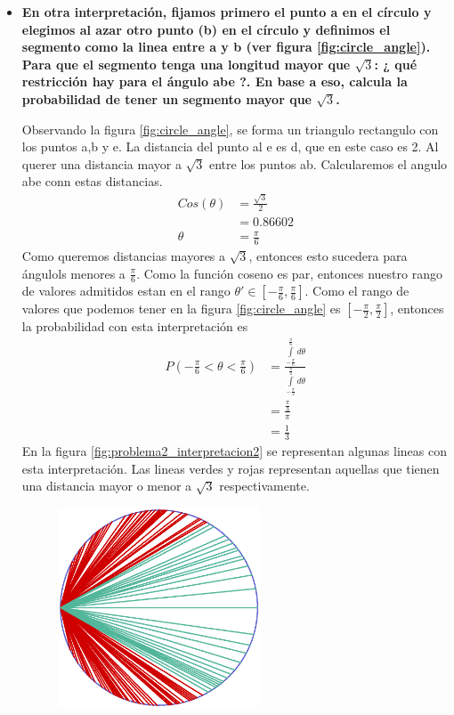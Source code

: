 \begin{itemize}
    \item \textbf{En otra interpretación, fijamos primero el punto a en el círculo y elegimos al azar otro punto (b) en el círculo y definimos el segmento como la linea entre a y b (ver figura \ref{fig:circle_angle}). Para que el segmento tenga una longitud mayor que $\sqrt{3}$: ¿ qué restricción hay para el ángulo abe ?. En base a eso, calcula la probabilidad de tener un segmento mayor que $\sqrt{3}$.}

          Observando la figura \ref{fig:circle_angle}, se forma un triangulo rectangulo con los puntos a,b y e. La distancia del punto al e es d, que en este caso es 2. Al querer una distancia mayor a $\sqrt{3}$ entre los puntos ab. Calcularemos el angulo abe conn estas distancias.
          \begin{align*}
              Cos(\theta) & = \frac{\sqrt{3}}{2} \\
                          & = 0.86602            \\
              \theta      & = \frac{\pi}{6}
          \end{align*}
          Como queremos distancias mayores a $\sqrt{3}$, entonces esto sucedera para ángulols menores a $\frac{\pi}{6}$. Como la función coseno es par, entonces nuestro rango de valores admitidos estan en el rango $\theta' \in[-\frac{\pi}{6},\frac{\pi}{6}]$. Como el rango de valores que podemos tener en la figura \ref{fig:circle_angle} es $[-\frac{\pi}{2},\frac{\pi}{2}]$, entonces la probabilidad con esta interpretación es
          \begin{align*}
              P(-\frac{\pi}{6}<\theta<\frac{\pi}{6}) & = \frac{\int\limits_{-\frac{\pi}{6}}^{\frac{\pi}{6}} d\theta}{\int\limits_{-\frac{\pi}{2}}^{\frac{\pi}{2}} d\theta} \\
                                                     & = \frac{\frac{\pi}{3}}{\pi}                                                                                         \\
                                                     & = \frac{1}{3}
          \end{align*}
          En la figura \ref{fig:problema2_interpretacion2} se representan algunas lineas con esta interpretación. Las lineas verdes y rojas representan aquellas que tienen una distancia mayor o menor a $\sqrt{3}$ respectivamente.
          \begin{figure}[H]
              \centering
              \includegraphics[width=6cm]{Graphics/circle_4.eps}

\end{figure}
\end{itemize}
